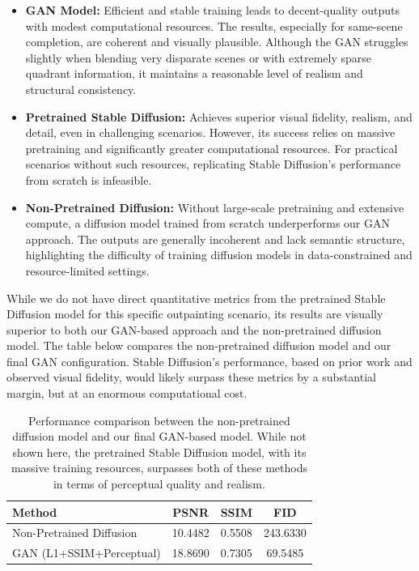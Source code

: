 \documentclass[sigconf]{acmart}
\begin{document}
\begin{itemize}
    \item \textbf{GAN Model:} Efficient and stable training leads to decent-quality outputs with modest computational resources. The results, especially for same-scene completion, are coherent and visually plausible. Although the GAN struggles slightly when blending very disparate scenes or with extremely sparse quadrant information, it maintains a reasonable level of realism and structural consistency.
    
    \item \textbf{Pretrained Stable Diffusion:} Achieves superior visual fidelity, realism, and detail, even in challenging scenarios. However, its success relies on massive pretraining and significantly greater computational resources. For practical scenarios without such resources, replicating Stable Diffusion’s performance from scratch is infeasible.
    
    \item \textbf{Non-Pretrained Diffusion:} Without large-scale pretraining and extensive compute, a diffusion model trained from scratch underperforms our GAN approach. The outputs are generally incoherent and lack semantic structure, highlighting the difficulty of training diffusion models in data-constrained and resource-limited settings.
\end{itemize}

While we do not have direct quantitative metrics from the pretrained Stable Diffusion model for this specific outpainting scenario, its results are visually superior to both our GAN-based approach and the non-pretrained diffusion model. The table below compares the non-pretrained diffusion model and our final GAN configuration. Stable Diffusion’s performance, based on prior work and observed visual fidelity, would likely surpass these metrics by a substantial margin, but at an enormous computational cost.

\begin{table}[h]
    \centering
    \begin{tabular}{lccc}
        \toprule
        \textbf{Method} & \textbf{PSNR} & \textbf{SSIM} & \textbf{FID} \\ 
        \midrule
        Non-Pretrained Diffusion & 10.4482 & 0.5508 & 243.6330 \\
        GAN (L1+SSIM+Perceptual) & 18.8690 & 0.7305 & 69.5485 \\
        \bottomrule
    \end{tabular}
    \caption{Performance comparison between the non-pretrained diffusion model and our final GAN-based model. While not shown here, the pretrained Stable Diffusion model, with its massive training resources, surpasses both of these methods in terms of perceptual quality and realism.}
    \label{tab:comparison}
\end{table}
\end{document}
